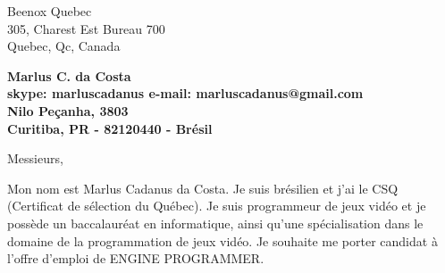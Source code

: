 \documentclass[11pt]{letter} %
\begin{document}

\begin{letter}{Beenox Quebec \\
305, Charest Est Bureau 700 \\
Quebec, Qc, Canada} 



\begin{center}
\large\bf Marlus C. da Costa \\ %
skype: marluscadanus e-mail: marluscadanus@gmail.com \\
Nilo Peçanha, 3803 \\ Curitiba, PR - 82120440 - Brésil
\end{center} 
\vfill

\signature{Marlus C. da Costa} %


\opening{Messieurs, } 


Mon nom est Marlus Cadanus da Costa. Je suis brésilien et j’ai le CSQ (Certificat de sélection du Québec). Je suis programmeur de jeux vidéo et je possède un baccalauréat en informatique, ainsi qu’une spécialisation dans le domaine de la programmation de jeux vidéo. Je souhaite me porter candidat à l’offre d’emploi de ENGINE PROGRAMMER.


\end{letter}
\end{document}
